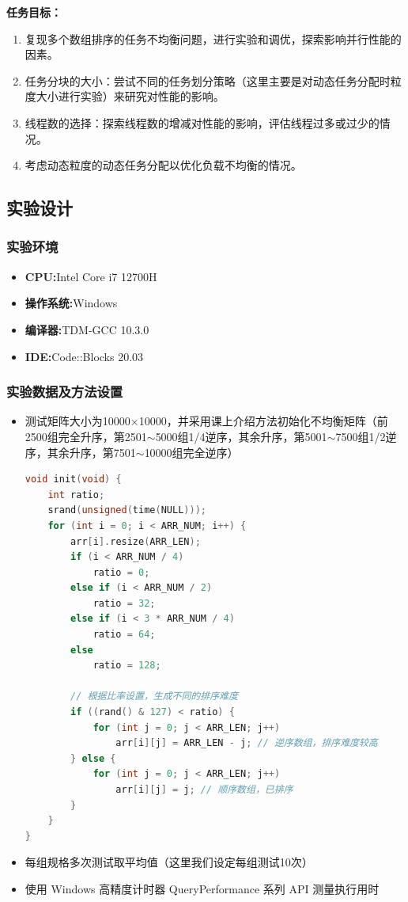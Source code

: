 \documentclass{nku}
\begin{document}
\textbf{任务目标：}
\begin{enumerate}
    \item 复现多个数组排序的任务不均衡问题，进行实验和调优，探索影响并行性能的因素。
    \item 任务分块的大小：尝试不同的任务划分策略（这里主要是对动态任务分配时粒度大小进行实验）来研究对性能的影响。
    \item 线程数的选择：探索线程数的增减对性能的影响，评估线程过多或过少的情况。
    \item 考虑动态粒度的动态任务分配以优化负载不均衡的情况。
\end{enumerate}

\subsection{实验设计}
\subsubsection{实验环境}
\begin{itemize}
    \item \textbf{CPU:}Intel Core i7 12700H
    \item \textbf{操作系统:}Windows
    \item \textbf{编译器:}TDM-GCC 10.3.0
    \item \textbf{IDE:}Code::Blocks 20.03
\end{itemize}

\subsubsection{实验数据及方法设置}
\begin{itemize}
    \item 测试矩阵大小为10000×10000，并采用课上介绍方法初始化不均衡矩阵（前2500组完全升序，第2501$\sim$5000组1/4逆序，其余升序，第5001$\sim$7500组1/2逆序，其余升序，第7501$\sim$10000组完全逆序）
\begin{lstlisting}[language=C]
void init(void) {
    int ratio;
    srand(unsigned(time(NULL)));
    for (int i = 0; i < ARR_NUM; i++) {
        arr[i].resize(ARR_LEN);
        if (i < ARR_NUM / 4)
            ratio = 0;
        else if (i < ARR_NUM / 2)
            ratio = 32;
        else if (i < 3 * ARR_NUM / 4)
            ratio = 64;
        else
            ratio = 128;
    
        // 根据比率设置，生成不同的排序难度
        if ((rand() & 127) < ratio) {
            for (int j = 0; j < ARR_LEN; j++)
                arr[i][j] = ARR_LEN - j; // 逆序数组，排序难度较高
        } else {
            for (int j = 0; j < ARR_LEN; j++)
                arr[i][j] = j; // 顺序数组，已排序
        }
    }
}
\end{lstlisting}
    \item 每组规格多次测试取平均值（这里我们设定每组测试10次）
    \item 使用 Windows 高精度计时器 QueryPerformance 系列 API 测量执行用时
\end{itemize}
\end{document}
